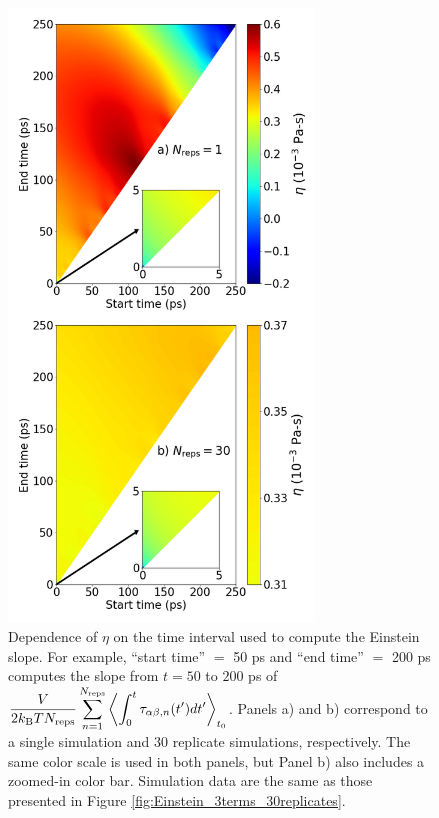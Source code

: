 \documentclass[9pt,bestpractices]{livecoms}
\begin{document}
\begin{figure}[htb!]
	\centering
	\includegraphics[width=3.2in]{Einstein_slope_time_interval.png}
	\caption{Dependence of $\eta$ on the time interval used to compute the Einstein slope. For example, ``start time'' $=$ 50 ps and ``end time'' $=$ 200 ps computes the slope from $t = 50$ to $200$ ps of $\displaystyle \frac{V}{2 k_{\rm B} T N_{\rm reps}} \sum_{n=1}^{N_{\rm reps}} \left\langle \int_0^t \tau_{\alpha\beta,n}(t') dt' \right\rangle_{t_0}$. Panels a) and b) correspond to a single simulation and 30 replicate simulations, respectively. The same color scale is used in both panels, but Panel b) also includes a zoomed-in color bar. Simulation data are the same as those presented in Figure \ref{fig:Einstein_3terms_30replicates}.}
	\label{fig:Einstein_slope_time_interval}
\end{figure}

\end{document}
